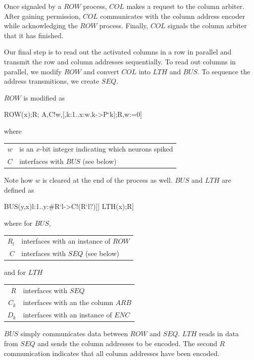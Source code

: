 \documentclass[aer.tex]{subfiles}
\begin{document}
Once signaled by a $ROW$ process, $COL$ makes a request to the column arbiter.
After gaining permission, $COL$ communicates with the column address encoder while
acknowledging the $ROW$ process. Finally, $COL$ signals the column arbiter that 
it has finished.

Our final step is to read out the activated columns in a row in parallel
and transmit the row and column addresses sequentially.
To read out columns in parallel, we modify $ROW$ and convert $COL$ into $LTH$ and $BUS$.
To sequence the address transmitions, we create $SEQ$.

$ROW$ is modified as

\begin{csp}
ROW(x)\equiv*[[\langle,k:1..x:#{P`k}->w.k+\rangle];R;
           A,C!w,[\langle,k:1..x:w.k->P`k\rangle];R,w:=0]
\end{csp}

where

\begin{tabular}[c]{rl}
$w$ & is an $x$-bit integer indicating which neurons spiked \\
$C$ & interfaces with $BUS$ (see below) \\
\end{tabular}

Note how $w$ is cleared at the end of the process as well. 
$BUS$ and $LTH$ are defined as

\begin{csp}
BUS(y,x)\equiv*[[\langle[]l:1..y:#{R`l}->C!(R`l?)\rangle]]
LTH(x)\equiv*[R?w;[\langle,k:1..x:w.k->C`k;D`k,w.k-;C`k\rangle];R]
\end{csp}

where for $BUS$,

\begin{tabular}[c]{rl}
$R_l$ & interfaces with an instance of $ROW$ \\
$C$ & interfaces with $SEQ$ (see below) \\
\end{tabular}

and for $LTH$

\begin{tabular}[c]{rl}
$R$ & interfaces with $SEQ$ \\
$C_k$ & interfaces with an the column $ARB$ \\
$D_k$ & interfaces with an instance of $ENC$ \\
\end{tabular}

$BUS$ simply communicates data between $ROW$ and $SEQ$. 
$LTH$ reads in data from $SEQ$ and sends the column addresses to be encoded.
The second $R$ communication indicates that all column addresses have been encoded.
\end{document}
